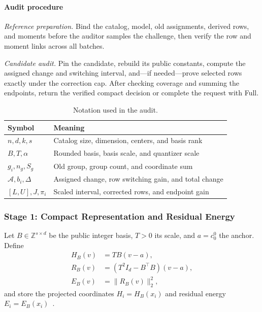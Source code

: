 \documentclass[5p,times,twocolumn]{elsarticle}
\begin{document}
\paragraph{Audit procedure}
\emph{Reference preparation.} Bind the catalog, model, old assignments, derived rows, and moments before the auditor samples the challenge, then verify the row and moment links across all batches.

\emph{Candidate audit.} Pin the candidate, rebuild its public constants, compute the assigned change and switching interval, and—if needed—prove selected rows exactly under the correction cap. After checking coverage and summing the endpoints, return the verified compact decision or complete the request with Full.

\begin{table}[tbp]
\centering\small
\caption{Notation used in the audit.}
\label{tab:concise-notation}
\begin{tabularx}{\columnwidth}{@{}lX@{}}\toprule
Symbol & Meaning\\\midrule
$n,d,k,s$ & Catalog size, dimension, centers, and basis rank\\
$B,T,\alpha$ & Rounded basis, basis scale, and quantizer scale\\
$g_i,n_g,S_g$ & Old group, group count, and coordinate sum\\
$\mathcal A,b_i,\Delta$ & Assigned change, row switching gain, and total change\\
$[L,U],J,\pi_i$ & Scaled interval, corrected rows, and endpoint gain\\
\bottomrule\end{tabularx}
\end{table}

\subsubsection{Stage 1: Compact Representation and Residual Energy}
\label{sec:methodology-representation}
Let $B\in\mathbb Z^{s\times d}$ be the public integer basis, $T>0$ its scale, and $a=c^0_0$ the anchor. Define
\begin{align}
 H_B(v)&=TB(v-a),\nonumber\\
 R_B(v)&=(T^2I_d-B^\top B)(v-a),\nonumber\\
 E_B(v)&=\|R_B(v)\|_2^2,
 \label{eq:methodology-statistics}
\end{align}
and store the projected coordinates $H_i=H_B(x_i)$ and residual energy $E_i=E_B(x_i)$~\cite{feldman2020tiny}.
\end{document}
